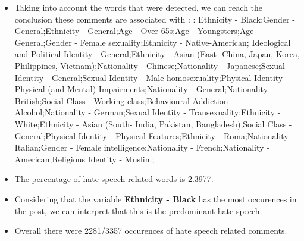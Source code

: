 \documentclass[11pt]{article}
\begin{document}
\begin{itemize}\item Taking into account the words that were detected, we can reach the conclusion these comments are associated with : : Ethnicity - Black;Gender - General;Ethnicity - General;Age - Over 65s;Age - Youngsters;Age - General;Gender - Female sexuality;Ethnicity - Native-American; Ideological and Political Identity - General;Ethnicity - Asian (East- China, Japan, Korea, Philippines, Vietnam);Nationality - Chinese;Nationality - Japanese;Sexual Identity - General;Sexual Identity - Male homosexuality;Physical Identity - Physical (and Mental) Impairments;Nationality - General;Nationality - British;Social Class - Working class;Behavioural Addiction - Alcohol;Nationality - German;Sexual Identity - Transexuality;Ethnicity - White;Ethnicity - Asian (South- India, Pakistan, Bangladesh);Social Class - General;Physical Identity - Physical Features;Ethnicity - Roma;Nationality - Italian;Gender - Female intelligence;Nationality - French;Nationality - American;Religious Identity - Muslim;%

\item The percentage of hate speech related words is 2.3977.

\item Considering that the variable \textbf{Ethnicity - Black} has the most occurences in the post, we can interpret that this is the predominant hate speech.

\item Overall there were 2281/3357 occurences of hate speech related comments.\end{itemize}
\end{document}
